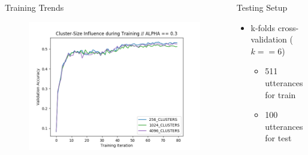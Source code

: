 \documentclass[final]{beamer} %
\newlength{\columnheight}
\begin{document}
\begin{frame}
\begin{columns}
\begin{column}{0.23\textwidth}
{\begin{block}{\boxnumber Training Trends}
                  \end{block}
                  
                  \vfill
                  
        \begin{figure}
            \centering
            \includegraphics[width=\linewidth]{figs/1_3_valid_acc.png}
        \end{figure}

        \vfill

        

      } %
    \end{column}




    
    \begin{column}{0.23\textwidth}
      \vspace{1cm}

      \parbox[t][\columnheight]{.9\textwidth}{
                
        \begin{block}{\boxnumber Testing Setup}
          \begin{itemize}
          \item k-folds cross-validation ($k==6$)
            \begin{itemize}
            \item 511 utterances for train
            \item 100 utterances for test
            \end{itemize}
          \end{itemize}
        \end{block}

}
\end{column}
\end{columns}
\end{frame}
\end{document}
